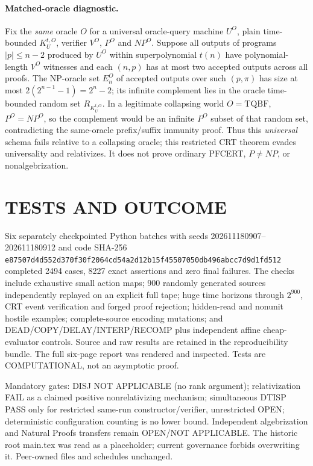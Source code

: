 \documentclass[11pt]{article}
\begin{document}
\paragraph{Matched-oracle diagnostic.} Fix the \emph{same} oracle $O$ for a universal oracle-query machine $U^O$, plain time-bounded $K_U^{t,O}$, verifier $V^O$, $P^O$ and $NP^O$. Suppose all outputs of programs $|p|\le n-2$ produced by $U^O$ within superpolynomial $t(n)$ have polynomial-length $V^O$ witnesses and each $(n,p)$ has at most two accepted outputs across all proofs. The NP-oracle set $E^O_n$ of accepted outputs over such $(p,\pi)$ has size at most $2(2^{n-1}-1)=2^n-2$; its infinite complement lies in the oracle time-bounded random set $R_{K_U^{t,O}}$. In a legitimate collapsing world $O=\mathrm{TQBF}$, $P^O=NP^O$, so the complement would be an infinite $P^O$ subset of that random set, contradicting the same-oracle prefix/suffix immunity proof. Thus this \emph{universal} schema fails relative to a collapsing oracle; this restricted CRT theorem evades universality and relativizes. It does not prove ordinary PFCERT, $P\ne NP$, or nonalgebrization.

\section{TESTS AND OUTCOME}
Six separately checkpointed Python batches with seeds 202611180907--202611180912 and code SHA-256 \texttt{e87507d4d552d370f30f2064cd54a2d12b15f45507050db496abcc7d9d1fd512} completed 2494 cases, 8227 exact assertions and zero final failures. The checks include exhaustive small action maps; 900 randomly generated sources independently replayed on an explicit full tape; huge time horizons through $2^{900}$, CRT event verification and forged proof rejection; hidden-read and nonunit hostile examples; complete-source encoding mutations; and DEAD/COPY/DELAY/INTERP/RECOMP plus independent affine cheap-evaluator controls. Source and raw results are retained in the reproducibility bundle. The full six-page report was rendered and inspected. Tests are COMPUTATIONAL, not an asymptotic proof.

Mandatory gates: DISJ NOT APPLICABLE (no rank argument); relativization FAIL as a claimed positive nonrelativizing mechanism; simultaneous DTISP PASS only for restricted same-run constructor/verifier, unrestricted OPEN; deterministic configuration counting is no lower bound. Independent algebrization and Natural Proofs transfers remain OPEN/NOT APPLICABLE. The historic root main.tex was read as a placeholder; current governance forbids overwriting it. Peer-owned files and schedules unchanged.
\end{document}
